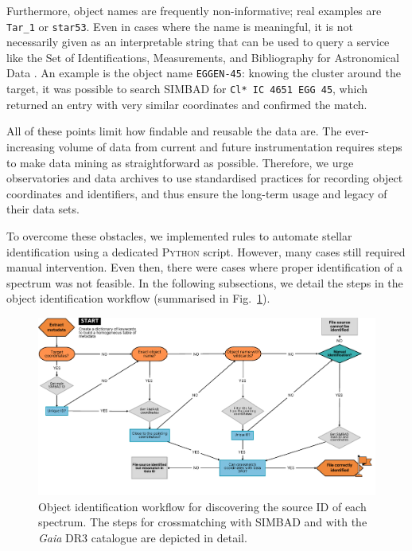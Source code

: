 \documentclass{aa}
\begin{document}
Furthermore, object names are frequently non-informative; real examples are \texttt{Tar\_1} or \texttt{star53}. Even in cases where the name is meaningful, it is not necessarily given as an interpretable string that can be used to query a service like the Set of Identifications, Measurements, and Bibliography for Astronomical Data \citep[SIMBAD,][]{Simbad}. An example is the object name \texttt{EGGEN-45}: knowing the cluster around the target, it was possible to search SIMBAD for \texttt{Cl* IC 4651 EGG 45}, which returned an entry with very similar coordinates and confirmed the match.

All of these points limit how findable and reusable the data are. The ever-increasing volume of data from current and future instrumentation requires steps to make data mining as straightforward as possible. Therefore, we urge observatories and data archives to use standardised practices for recording object coordinates and identifiers, and thus ensure the long-term usage and legacy of their data sets.

To overcome these obstacles, we implemented rules to automate stellar identification using a dedicated \textsc{Python} script. However, many cases still required manual intervention. Even then, there were cases where proper identification of a spectrum was not feasible. In the following subsections, we detail the steps in the object identification workflow (summarised in Fig.~\ref{fig:crossmatch_workflow}).

\begin{figure}[htbp]
  \centering
  \includegraphics[width=1.0\textwidth]{Plots/crossmatch_workflow.pdf}
  \caption{Object identification workflow for discovering the source ID of each spectrum. The steps for crossmatching with SIMBAD and with the \textit{Gaia} DR3 catalogue are depicted in detail.}
  \label{fig:crossmatch_workflow}
\end{figure}
\end{document}
